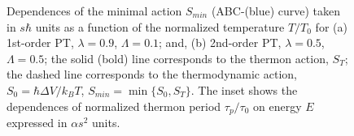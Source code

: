 \documentclass[fleqn,10pt]{wlscirep}
\begin{document}
%
\begin{figure}[ht]
\begin{minipage}[h]{0.49\linewidth}
\end{minipage}
\hfill
\begin{minipage}[h]{0.49\linewidth}
\end{minipage}
\caption{Dependences of the minimal action $S_{min}$ (ABC-(blue) curve) taken in $s\hbar$ units as a function of the normalized temperature $ T/T_{0}$ for (a) 1st-order PT, $\lambda = 0.9$, $\Lambda = 0.1$; and, (b) 2nd-order PT, $\lambda = 0.5$, $\Lambda = 0.5$; the solid (bold) line corresponds to the thermon action, $S_T$; the dashed line corresponds to the thermodynamic action, $S_0 = \hbar \Delta V / k_B T$, $S_{min} = \min \{S_0, S_T\}$. The inset shows the dependences of normalized thermon period $\tau_p / \tau_0$ on energy $E$ expressed in $\alpha s^2$ units. 
\label{pic:action_period}}
\end{figure}
%
\end{document}
